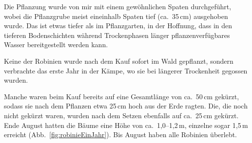 \documentclass[twocolumn]{scrartcl}
\begin{document}
Die Pflanzung wurde von mir mit einem gewöhnlichen Spaten
durchgeführt, wobei die Pflanzgrube meist eineinhalb Spaten tief
(ca.~35\,cm) ausgehoben wurde. Das ist etwas tiefer als im
Pflanzgarten, in der Hoffnung, dass in den tieferen Bodenschichten
während Trockenphasen länger pflanzenverfügbares Wasser bereitgestellt
werden kann.

Keine der Robinien wurde nach dem Kauf sofort im Wald gepflanzt,
sondern verbrachte das erste Jahr in der Kämpe, wo sie bei längerer
Trockenheit gegossen wurden.

Manche waren beim Kauf bereits auf eine Gesamtlänge von ca.~50\,cm
gekürzt, sodass sie nach dem Pflanzen etwa 25\,cm hoch aus der Erde
ragten. Die, die noch nicht gekürzt waren, wurden nach dem Setzen
ebenfalls auf ca.~25\,cm gekürzt. Ende August hatten die Bäume eine
Höhe von ca.~1,0--1,2\,m, einzelne sogar 1,5\,m erreicht
(Abb.~\ref{fig:robinieEinJahr}). Bis August haben alle Robinien
überlebt.
\end{document}
